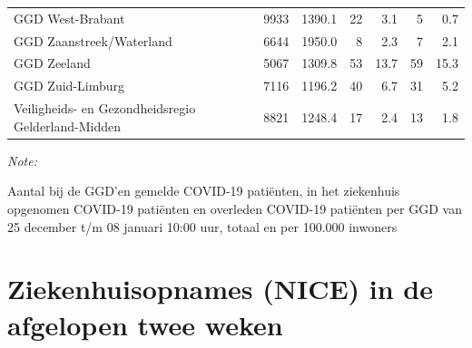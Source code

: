 \documentclass[
  english,
  man,floatsintext]{apa6}
\begin{document}
\begin{table}
\begin{threeparttable}
\begin{tabular}{lrrrrrr}
GGD West-Brabant & 9933 & 1390.1 & 22 & 3.1 & 5 & 0.7\\
GGD Zaanstreek/Waterland & 6644 & 1950.0 & 8 & 2.3 & 7 & 2.1\\
GGD Zeeland & 5067 & 1309.8 & 53 & 13.7 & 59 & 15.3\\
GGD Zuid-Limburg & 7116 & 1196.2 & 40 & 6.7 & 31 & 5.2\\
Veiligheids- en Gezondheidsregio Gelderland-Midden & 8821 & 1248.4 & 17 & 2.4 & 13 & 1.8\\
\bottomrule
\end{tabular}
\begin{tablenotes}
\item \textit{Note: } 
\item Aantal bij de GGD’en gemelde COVID-19 patiënten, in het ziekenhuis opgenomen COVID-19 patiënten en overleden COVID-19 patiënten per GGD van 25 december t/m 08 januari 10:00 uur, totaal en per 100.000 inwoners
\end{tablenotes}
\end{threeparttable}
\endgroup{}
\end{table}

\newpage

\hypertarget{ziekenhuisopnames-nice-in-de-afgelopen-twee-weken}{%
\section{Ziekenhuisopnames (NICE) in de afgelopen twee weken}\label{ziekenhuisopnames-nice-in-de-afgelopen-twee-weken}}
\end{document}
